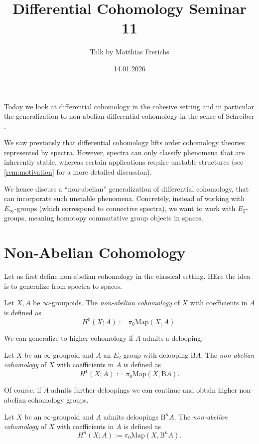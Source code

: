 \documentclass[10pt]{amsart}
\title{Differential Cohomology Seminar 11}
\date{14.01.2026}
\author{Talk by Matthias Frerichs}
\begin{document}
\maketitle

Today we look at differential cohomology in the cohesive setting and in particular the generalization to non-abelian differential cohomology in the sense of Schreiber \cite{schreiber2013cohesive,fiorenzasatischreiber2024charactermap}.

We saw previously that differential cohomology lifts order cohomology theories represented by spectra. However, spectra can only classify phenomena that are inherently stable, whereas certain applications require unstable structures (see \cref{rem:motivation} for a more detailed discussion).

We hence discuss a ``non-abelian'' generalization of differential cohomology, that can incorporate such unstable phenomena. Concretely, instead of working with $E_\infty$-groups (which correspond to connective spectra), we want to work with $E_2$-groups, meaning homotopy commutative group objects in spaces.

\section{Non-Abelian Cohomology}
Let us first define non-abelian cohomology in the classical setting. HEre the idea is to generalize from spectra to spaces.

\begin{definition}
	Let $X, A$ be $\infty$-groupoids. The \emph{non-abelian cohomology} of $X$ with coefficients in $A$ is defined as
	\[	H^0(X; A) := \pi_0 \mathrm{Map}(X, A). \]
\end{definition}

We can generalize to higher cohomology if $A$ admits a delooping.

\begin{definition}
	Let $X$ be an $\infty$-groupoid and $A$ an	$E_2$-group with delooping $\mathrm{B}A$. The \emph{non-abelian cohomology} of $X$ with coefficients in $A$ is defined as
	\[	H^1(X; A) := \pi_0 \mathrm{Map}(X, \mathrm{B} A). \]
\end{definition}	

Of course, if $A$	admits further deloopings we can continue and obtain higher non-abelian cohomology groups.

\begin{definition}
	Let $X$ be an $\infty$-groupoid and $A$ admits deloopings $\mathrm{B}^n A$. The \emph{non-abelian cohomology} of $X$ with coefficients in $A$ is defined as
	\[	H^n(X; A) := \pi_0 \mathrm{Map}(X, \mathrm{B}^n A). \]
\end{definition}	
\end{document}
